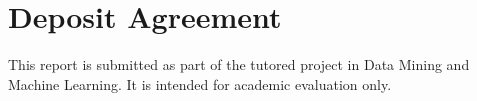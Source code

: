 
\chapter*{Deposit Agreement}
This report is submitted as part of the tutored project in Data Mining and Machine Learning.
It is intended for academic evaluation only.
